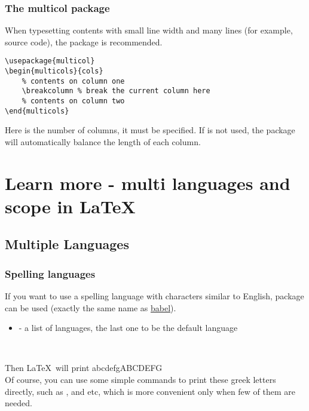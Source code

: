 \begin{frame}[fragile]
	\frametitle{The multicol package}
	When typesetting contents with small line width and many lines (for example, source code), the  package is recommended.
	\begin{command}
		\begin{verbatim}
\usepackage{multicol}
\begin{multicols}{cols}
    % contents on column one
    \breakcolumn % break the current column here
    % contents on column two
\end{multicols}
		\end{verbatim}
	\end{command}
	Here  is the number of columns, it must be specified. If \LC{\breakcolumn} is not used, the  package will automatically balance the length of each column.
\end{frame}

\section{Learn more - multi languages and scope in \LaTeX}
\begin{frame}
\end{frame}

\subsection{Multiple Languages}

\begin{frame}[fragile]
	\frametitle{Spelling languages}
	If you want to use a spelling language with characters similar to English, package  can be used (exactly the same name as \href{http://babeljs.io/}{babel}).
	\begin{command}
		\LC{\usepackage[languages]{babel}}
		\footnotesize
		\begin{itemize}
			\item {} - a list of languages, the last one to be the default language
		\end{itemize}
	\end{command}
	\begin{example}
		 \\
	\end{example}
	Then \LaTeX\ will print \textgreek{abcdefgABCDEFG} \\
	Of course, you can use some simple commands to print these greek letters directly, such as \LC{\alpha}, \LC{\beta} and etc, which is more convenient only when few of them are needed.
\end{frame}

